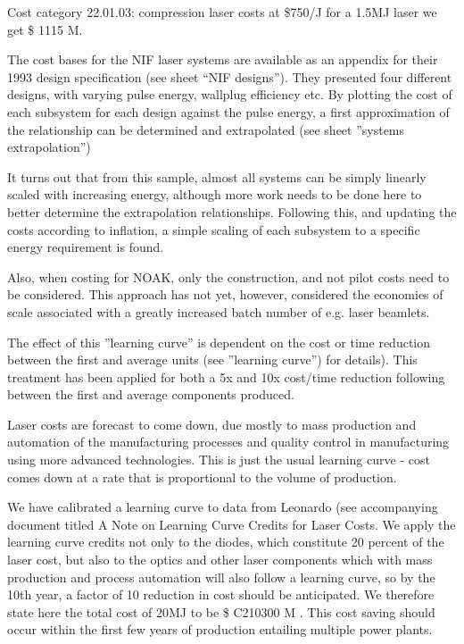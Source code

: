 Cost category 22.01.03: compression laser costs at  \$750/J for a 1.5MJ laser we get \$ 1115 M.


The cost bases for the NIF laser systems are available 
as an appendix for their 1993 design specification (see sheet ``NIF designs''). They presented four different designs, with varying pulse energy, wallplug efficiency etc. By plotting the cost of each subsystem for each design against the pulse energy, a first approximation of the relationship  can be determined and extrapolated (see sheet ''systems extrapolation'')

It turns out that from this sample, almost all systems can be simply linearly scaled with increasing energy, although more work  needs to be done here to better determine the extrapolation relationships.  Following this, and updating the costs according to inflation, a simple scaling of each subsystem to a specific energy requirement is found.

Also, when costing for NOAK, only the construction, and not pilot costs need to be considered. This approach has not yet, however, considered the economies of scale associated with a greatly increased batch 
number of e.g. laser beamlets.

The effect of this ''learning curve'' is dependent on the cost or time reduction between the first and average units (see ''learning curve'') for details). This treatment has been applied for both a 5x and 10x cost/time 
reduction following between the first and average components produced.

Laser costs are forecast to come down, due mostly to mass production and automation of the manufacturing processes and quality control in manufacturing using more advanced technologies. This is just the usual learning curve - cost comes down at a rate that is proportional to the volume of production. 

We have calibrated a learning curve to data from Leonardo (see accompanying document titled A Note on Learning Curve Credits for Laser Costs. We apply the learning curve credits not only to the diodes, which constitute 20 percent of the laser cost, but also to the optics and other laser components which with mass production and process automation will also follow a learning curve, so by the 10th year, a factor of 10 reduction in cost should be anticipated.  We therefore state here the total cost of 20MJ to be \$ C210300 M .  This cost saving should occur within the first few years of production entailing multiple power plants.

